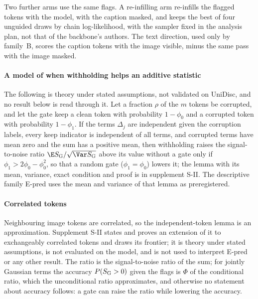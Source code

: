 Two further arms use the same flags.
A re-infilling arm re-infills the flagged tokens with the model, with the caption masked, and keeps the best of four unguided draws by chain log-likelihood,
with the sampler fixed in the analysis plan, not that of the backbone's authors.
The text direction, used only by family~B, scores the caption tokens with the image visible, minus the same pass with the image masked.

\paragraph*{A model of when withholding helps an additive statistic}
The following is theory under stated assumptions, not validated on UniDisc, and no result below is read through it.
Let a fraction $\rho$ of the $m$ tokens be corrupted, and let the gate keep a clean token with probability $1-\phi_0$ and a corrupted token with probability $1-\phi_1$.
If the terms $\Delta_j$ are independent given the corruption labels, every keep indicator is independent of all terms, and corrupted terms have mean zero and the sum has a positive mean, then withholding raises the signal-to-noise ratio $\E S_{\rm G}/\sqrt{\Var S_{\rm G}}$ above its value without a gate only if $\phi_1>2\phi_0-\phi_0^2$, so that a random gate ($\phi_1=\phi_0$) lowers it; the lemma with its mean, variance, exact condition and proof is in supplement S-II.
The descriptive family E-pred uses the mean and variance of that lemma as preregistered.

\paragraph*{Correlated tokens}
Neighbouring image tokens are correlated, so the independent-token lemma is an approximation.
Supplement S-II states and proves an extension of it to exchangeably correlated tokens and draws its frontier; it is theory
under stated assumptions, is not evaluated on the model, and is not used to interpret E-pred or any other result.
The ratio is the signal-to-noise ratio of the sum; for jointly Gaussian terms the accuracy $P(S_{\rm G}>0)$ given the flags is $\Phi$ of the
conditional ratio, which the unconditional ratio approximates, and otherwise no statement about accuracy follows: a gate can raise the ratio
while lowering the accuracy.

